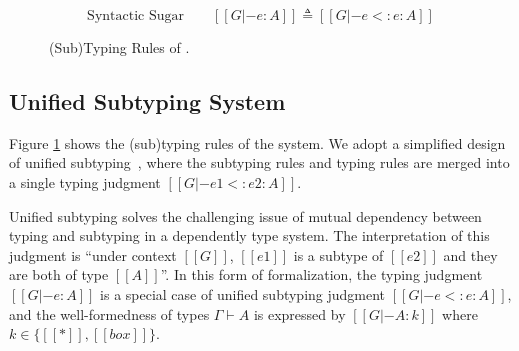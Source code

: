 \begin{figure}
    \begin{equation*}
       \text{Syntactic Sugar} \qquad [[G |- e : A]] \triangleq [[G |- e <: e : A]]
    \end{equation*}
    \caption{(Sub)Typing Rules of \name.}
    \label{fig:typing}
\end{figure}

\subsection{Unified Subtyping System}
\label{sec:type-system}

Figure \ref{fig:typing} shows the (sub)typing rules of the system. We adopt a
simplified design of unified subtyping~\cite{yang2017unifying}, where the subtyping rules and
typing rules are merged into a single typing judgment $[[G |- e1 <: e2 : A]]$.

Unified subtyping solves the challenging issue of mutual dependency between typing
and subtyping in a dependently type system.
The interpretation of this judgment is ``under context $[[G]]$, $[[e1]]$ is a
subtype of $[[e2]]$ and they are both of type $[[A]]$''.
In this form of formalization, the typing judgment $[[G |- e : A]]$ is a
special case of unified subtyping judgment $[[G |- e <: e : A]]$,
and the well-formedness of types $\Gamma \vdash A$ is expressed by
$[[G |- A : k]]$ where $k \in \{[[*]], [[box]]\}$.

